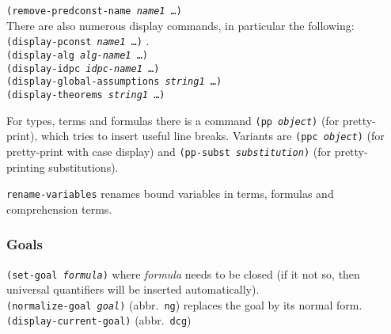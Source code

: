 \documentclass[12pt]{amsart}
\begin{document}
\texttt{(remove-predconst-name \textsl{name1} \dots)}%
\\
There are also numerous display commands, in particular the following:\\

\texttt{(display-pconst \textsl{name1} \dots)}%
.\\

\texttt{(display-alg \textsl{alg-name1} \dots)}%
\\

\texttt{(display-idpc \textsl{idpc-name1} \dots)}%
\\

\texttt{(display-global-assumptions \textsl{string1} \dots)}%
\\

\texttt{(display-theorems \textsl{string1} \dots)}%

For types, terms and formulas there is a command \texttt{(pp
  \textsl{object})} (for pretty-print), which
tries to insert useful line breaks.  Variants are \texttt{(ppc
  \textsl{object})} (for pretty-print with case
display) and \texttt{(pp-subst \textsl{substitution})}%
 (for pretty-printing substitutions).

\texttt{rename-variables}%
 renames bound
variables in terms, formulas and comprehension terms.

\subsubsection{Goals}

\texttt{(set-goal \textsl{formula})}
where \textsl{formula} needs to be closed (if it not so, then
universal quantifiers will be inserted automatically).\\

\texttt{(normalize-goal \textsl{goal})}%
  (abbr.\
\texttt{ng})
replaces the goal by its normal form.\\

\texttt{(display-current-goal)}%
 (abbr.\ \texttt{dcg})
\end{document}
